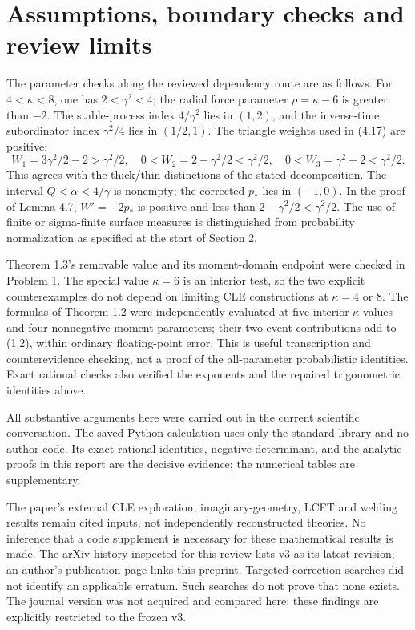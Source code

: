 \documentclass[10pt]{article}
\begin{document}
\section*{Assumptions, boundary checks and review limits}
The parameter checks along the reviewed dependency route are as follows. For \(4<\kappa<8\), one has \(2<\gamma^2<4\); the radial force parameter \(\rho=\kappa-6\) is greater than \(-2\). The stable-process index \(4/\gamma^2\) lies in \((1,2)\), and the inverse-time subordinator index \(\gamma^2/4\) lies in \((1/2,1)\). The triangle weights used in (4.17) are positive: \[W_1=3\gamma^2/2-2>\gamma^2/2,\quad
 0<W_2=2-\gamma^2/2<\gamma^2/2,\quad
 0<W_3=\gamma^2-2<\gamma^2/2.\] This agrees with the thick/thin distinctions of the stated decomposition. The interval \(Q<\alpha<4/\gamma\) is nonempty; the corrected \(p_*\) lies in \((-1,0)\). In the proof of Lemma 4.7, \(W'=-2p_*\) is positive and less than \(2-\gamma^2/2<\gamma^2/2\). The use of finite or sigma-finite surface measures is distinguished from probability normalization as specified at the start of Section 2.\par
Theorem 1.3’s removable value and its moment-domain endpoint were checked in Problem 1. The special value \(\kappa=6\) is an interior test, so the two explicit counterexamples do not depend on limiting CLE constructions at \(\kappa=4\) or \(8\). The formulas of Theorem 1.2 were independently evaluated at five interior \(\kappa\)-values and four nonnegative moment parameters; their two event contributions add to (1.2), within ordinary floating-point error. This is useful transcription and counterevidence checking, not a proof of the all-parameter probabilistic identities. Exact rational checks also verified the exponents and the repaired trigonometric identities above.\par
All substantive arguments here were carried out in the current scientific conversation. The saved Python calculation uses only the standard library and no author code. Its exact rational identities, negative determinant, and the analytic proofs in this report are the decisive evidence; the numerical tables are supplementary.\par
The paper’s external CLE exploration, imaginary-geometry, LCFT and welding results remain cited inputs, not independently reconstructed theories. No inference that a code supplement is necessary for these mathematical results is made. The arXiv history inspected for this review lists v3 as its latest revision; an author’s publication page links this preprint. Targeted correction searches did not identify an applicable erratum. Such searches do not prove that none exists. The journal version was not acquired and compared here; these findings are explicitly restricted to the frozen v3.\par
\end{document}

